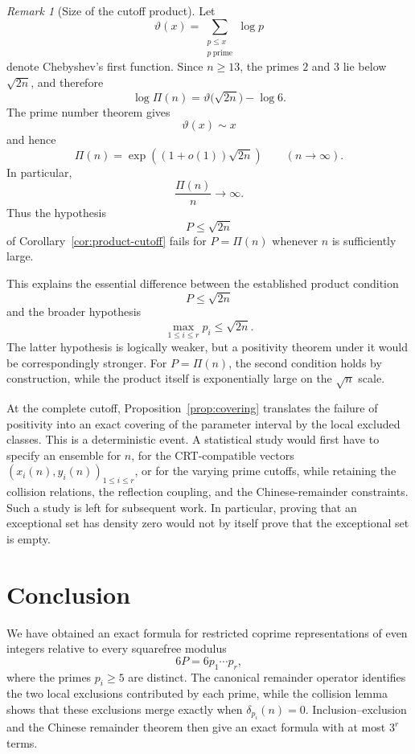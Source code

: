 \documentclass[12pt]{article}
\numberwithin{equation}{section}
\theoremstyle{definition}
\theoremstyle{remark}
\newtheorem{remark}[theorem]{Remark}
\begin{document}
\begin{remark}[Size of the cutoff product]
Let
\[
\vartheta(x)
=
\sum_{\substack{p\leq x\\p\ \mathrm{prime}}}\log p
\]
denote Chebyshev's first function. Since $n\geq13$, the primes
$2$ and $3$ lie below $\sqrt{2n}$, and therefore
\begin{equation}
\label{eq:Pi-growth}
\log\Pi(n)
=
\vartheta\bigl(\sqrt{2n}\bigr)-\log6.
\end{equation}
The prime number theorem \cite[Chapter~13]{Apostol1976} gives
\[
\vartheta(x)\sim x
\]
and hence
\begin{equation}
\label{eq:Pi-asymptotic}
\Pi(n)
=
\exp\left(
(1+o(1))\sqrt{2n}
\right)
\qquad
(n\to\infty).
\end{equation}
In particular,
\[
\frac{\Pi(n)}{n}\longrightarrow\infty.
\]
Thus the hypothesis
\[
P\leq\sqrt{2n}
\]
of Corollary~\ref{cor:product-cutoff} fails for
$P=\Pi(n)$ whenever $n$ is sufficiently large.

This explains the essential difference between the established
product condition
\[
P\leq\sqrt{2n}
\]
and the broader hypothesis
\[
\max_{1\leq i\leq r}p_i\leq\sqrt{2n}.
\]
The latter hypothesis is logically weaker, but a positivity
theorem under it would be correspondingly stronger.
For $P=\Pi(n)$, the second condition holds by construction,
while the product itself is exponentially large on the
$\sqrt n$ scale.
\end{remark}

At the complete cutoff, Proposition~\ref{prop:covering}
translates the failure of positivity into an exact covering of
the parameter interval by the local excluded classes. This is a
deterministic event. A statistical study would first have to
specify an ensemble for $n$, for the CRT-compatible vectors
$(x_i(n),y_i(n))_{1\leq i\leq r}$, or for the varying prime
cutoffs, while retaining the collision
relations, the reflection coupling, and the Chinese-remainder
constraints. Such a study is left for subsequent work. In
particular, proving that an exceptional set has density zero
would not by itself prove that the exceptional set is empty.

\section{Conclusion}

We have obtained an exact formula for restricted coprime
representations of even integers relative to every squarefree
modulus
\[
6P=6p_1\cdots p_r,
\]
where the primes $p_i\geq5$ are distinct. The canonical
remainder operator identifies the two local exclusions
contributed by each prime, while the collision lemma shows that
these exclusions merge exactly when
$\delta_{p_i}(n)=0$. Inclusion--exclusion and the Chinese
remainder theorem then give an exact formula with at most
$3^r$ terms.
\end{document}
